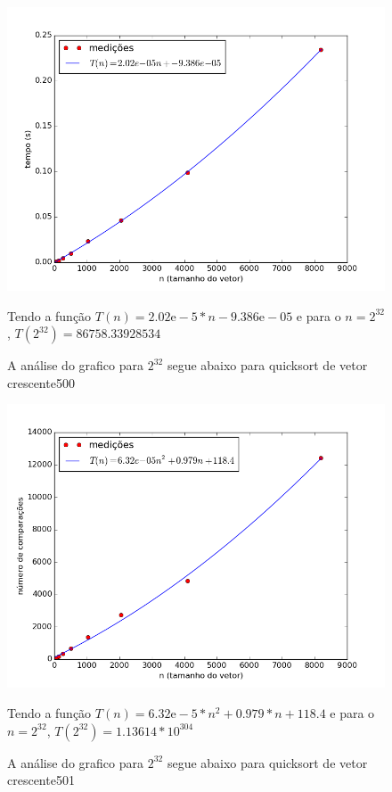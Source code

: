 \documentclass[12pt,a4paper,twoside]{report}
\begin{document}


\begin{figure}[ht]
\centering \includegraphics[scale=0.8]{../quicksort/imagens/quicksortQuaseCresc500.png}
\caption{A análise do grafico para $2^{32}$ segue abaixo para quicksort de vetor crescente500}

Tendo a função $T(n) = 2.02\mathrm{e}-5*n-9.386\mathrm{e}-05$ e para o $n =2^{32}$, $T(2^{32}) = 86758.33928534$ 

\label{fig:quicksortQuaseCresc500}
\end{figure}

\begin{figure}[ht]
\centering \includegraphics[scale=0.8]{../quicksort/imagens/quicksortQuaseCresc501.png}
\caption{A análise do grafico para $2^{32}$ segue abaixo para quicksort de vetor crescente501}

Tendo a função $T(n) = 6.32\mathrm{e}-5*n^2+0.979*n+118.4$ e para o $n =2^{32}$, $T(2^{32}) = 1.13614*10^{304}$ 

\label{fig:quicksortQuaseCresc501}
\end{figure}
\end{document}

